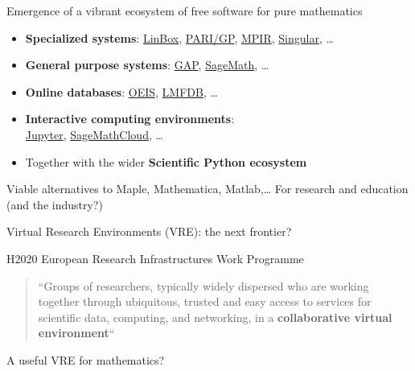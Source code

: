 \documentclass{beamer}
\begin{document}
\begin{frame}{Emergence of a vibrant ecosystem of free software for
    pure mathematics}
  \label{emergence-of-a-vibrant-ecosystem-of-free-software-for-pure-mathematics}

  \begin{itemize}
  \item \textbf{Specialized systems}: \href{http://www.linalg.org/}{LinBox},
    \href{http://pari.math.u-bordeaux.fr/}{PARI/GP},
    \href{http://mpir.org/}{MPIR},
    \href{http://www.singular.uni-kl.de/}{Singular}, \ldots{}
  \item \textbf{General purpose systems}: \href{http://www.gap-system.org/}{GAP},
    \href{http://www.sagemath.org/}{SageMath}, \ldots{}
  \item \textbf{Online databases}: \href{https://oeis.org/}{OEIS},
    \href{http://www.lmfdb.org/}{LMFDB}, \ldots{}
  \item \textbf{Interactive computing environments}:\\
    \href{https://jupyter.org/}{Jupyter},
    \href{https://cloud.sagemath.com/}{SageMathCloud}, \ldots{}
  \item Together with the wider \textbf{Scientific Python ecosystem}
  \end{itemize}
  \bigskip\pause

  \begin{block}{Viable alternatives to Maple, Mathematica, Matlab,\ldots{}}
    \label{viable-alternatives-to-maple-mathematica-matlab}
    For research and education (and the industry?)
  \end{block}
\end{frame}


\begin{frame}{Virtual Research Environments (VRE): the next frontier?}

  \begin{block}{H2020 European Research Infrastructures Work Programme}

    \begin{quote}
      ``Groups of researchers, typically widely dispersed who are working
      together through ubiquitous, trusted and easy access to services
      for scientific data, computing, and networking, in a
      \textbf{collaborative virtual environment}``
    \end{quote}
  \end{block}
  \bigskip

  \begin{block}{A useful VRE for mathematics?}
  \end{block}
\end{frame}
\end{document}
